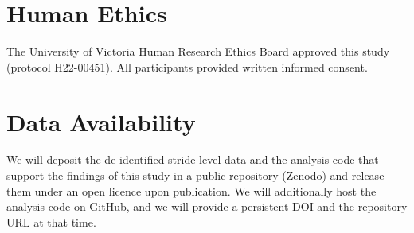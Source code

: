 \documentclass[fleqn,10pt,lineno]{wlpeerj}
\begin{document}
\section*{Human Ethics}

The University of Victoria Human Research Ethics Board approved this study (protocol H22-00451). All participants provided written informed consent.

\clearpage
\section*{Data Availability}

We will deposit the de-identified stride-level data and the analysis code that support the findings of this study in a public repository (Zenodo) and release them under an open licence upon publication. We will additionally host the analysis code on GitHub, and we will provide a persistent DOI and the repository URL at that time.



\end{document}

